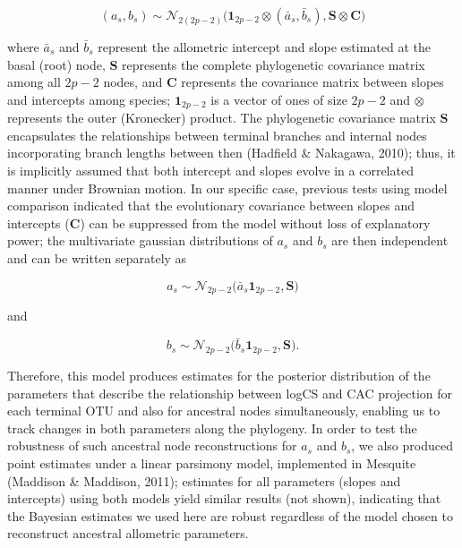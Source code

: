 \documentclass[12pt,twoside]{report}
\begin{document}
\begin{equation}
(a_{s}, b_{s}) \sim \mathcal{N}_{2(2p - 2)} \Big(\mathbf{1}_{2p - 2} \otimes (\bar{a}_s, \bar{b}_s), \mathbf{S} \otimes \mathbf{C} \Big)
\end{equation}

where $\bar{a}_s$ and $\bar{b}_s$ represent the allometric intercept and
slope estimated at the basal (root) node, $\mathbf{S}$ represents the
complete phylogenetic covariance matrix among all $2p - 2$ nodes, and
$\mathbf{C}$ represents the covariance matrix between slopes and
intercepts among species; $\mathbf{1}_{2p - 2}$ is a vector of ones of
size $2p - 2$ and $\otimes$ represents the outer (Kronecker) product.
The phylogenetic covariance matrix $\mathbf{S}$ encapsulates the
relationships between terminal branches and internal nodes incorporating
branch lengths between then (Hadfield \& Nakagawa, 2010); thus, it is
implicitly assumed that both intercept and slopes evolve in a correlated
manner under Brownian motion. In our specific case, previous tests using
model comparison indicated that the evolutionary covariance between
slopes and intercepts ($\mathbf{C}$) can be suppressed from the model
without loss of explanatory power; the multivariate gaussian
distributions of $a_s$ and $b_s$ are then independent and can be written
separately as

\begin{equation}
a_{s} \sim \mathcal{N}_{2p - 2} \Big(\bar{a}_s\mathbf{1}_{2p - 2}, \mathbf{S}\Big)
\end{equation}

and

\begin{equation}
b_{s} \sim \mathcal{N}_{2p - 2} \Big(\bar{b}_s\mathbf{1}_{2p - 2}, \mathbf{S}\Big).
\end{equation}

Therefore, this model produces estimates for the posterior distribution
of the parameters that describe the relationship between logCS and CAC
projection for each terminal OTU and also for ancestral nodes
simultaneously, enabling us to track changes in both parameters along
the phylogeny. In order to test the robustness of such ancestral node
reconstructions for $a_s$ and $b_s$, we also produced point estimates
under a linear parsimony model, implemented in Mesquite (Maddison \&
Maddison, 2011); estimates for all parameters (slopes and intercepts)
using both models yield similar results (not shown), indicating that the
Bayesian estimates we used here are robust regardless of the model
chosen to reconstruct ancestral allometric parameters.
\end{document}
